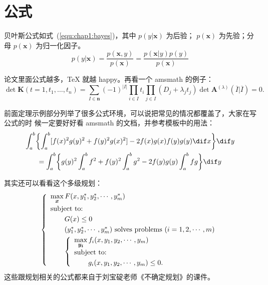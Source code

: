 \documentclass[../Main/thesis.tex]{subfiles}
\begin{document}
\section{公式}
\label{sec:equation}
贝叶斯公式如式~(\ref{equ:chap1:bayes})，其中 $p(y|\mathbf{x})$ 为后验；
$p(\mathbf{x})$ 为先验；分母 $p(\mathbf{x})$ 为归一化因子。
\begin{equation}
  \label{equ:chap1:bayes}
  p(y|\mathbf{x}) = \frac{p(\mathbf{x},y)}{p(\mathbf{x})}=
  \frac{p(\mathbf{x}|y)p(y)}{p(\mathbf{x})}
\end{equation}

论文里面公式越多，\TeX{} 就越 happy。再看一个 \textsf{amsmath} 的例子：
\newcommand{\envert}[1]{\left\lvert#1\right\rvert}
\begin{equation}\label{detK2}
  \det\mathbf{K}(t=1,t_1,\dots,t_n)=\sum_{I\in\mathbf{n}}(-1)^{\envert{I}}
  \prod_{i\in I}t_i\prod_{j\in I}(D_j+\lambda_jt_j)\det\mathbf{A}
  ^{(\lambda)}(\overline{I}|\overline{I})=0.
\end{equation}

前面定理示例部分列举了很多公式环境，可以说把常见的情况都覆盖了，大家在写公式的时
候一定要好好看 \textsf{amsmath} 的文档，并参考模板中的用法：
\begin{multline*}%
  \int_a^b\biggl\{\int_a^b[f(x)^2g(y)^2+f(y)^2g(x)^2]
  -2f(x)g(x)f(y)g(y)\dif x\biggr\}\dif y \\
  =\int_a^b\biggl\{g(y)^2\int_a^bf^2+f(y)^2
  \int_a^b g^2-2f(y)g(y)\int_a^b fg\biggr\}\dif y
\end{multline*}

其实还可以看看这个多级规划：
\begin{equation}\label{bilevel}
  \left\{\begin{array}{l}
    \max\limits_{{\mbox{\footnotesize\boldmath $x$}}} F(x,y_1^*,y_2^*,\cdots,y_m^*) \\[0.2cm]
    \mbox{subject to:}                                                              \\[0.1cm]
    \qquad G(x)\le 0                                                                \\[0.1cm]
    \qquad(y_1^*,y_2^*,\cdots,y_m^*)\mbox{ solves problems }(i=1,2,\cdots,m)        \\[0.1cm]
    \qquad\left\{\begin{array}{l}
      \max\limits_{{\mbox{\footnotesize\boldmath $y_i$}}}f_i(x,y_1,y_2,\cdots,y_m) \\[0.2cm]
      \mbox{subject to:}                                                           \\[0.1cm]
      \qquad g_i(x,y_1,y_2,\cdots,y_m)\le 0.
    \end{array}\right.
  \end{array}\right.
\end{equation}
这些跟规划相关的公式都来自于刘宝碇老师《不确定规划》的课件。
\end{document}
